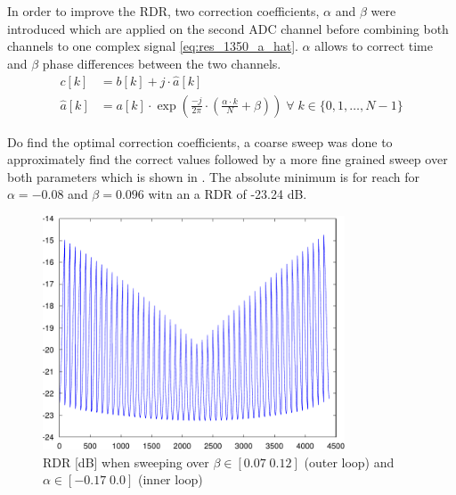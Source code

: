 In order to improve the \gls{RDR}, two correction coefficients, $\alpha$ and
$\beta$ were introduced which are applied on the second \gls{ADC} channel
before combining both channels to one complex signal \eqref{eq:res_1350_a_hat}.
$\alpha$ allows to correct time and $\beta$ phase differences between
the two  channels. \\

\begin{align}
  c[k] &= b[k] + j \cdot \hat a[k] \\
  \hat a[k] &= a[k]  \cdot \exp\left(
  \frac{-j}{2 \pi} \cdot \left(\frac{\alpha \cdot k}{N} + \beta\right)
  \right) \;\forall\; k \in \{0, 1, \dots,  N-1\}
  \label{eq:res_1350_a_hat}
\end{align}

Do find the optimal correction coefficients, a coarse sweep was done to approximately
find the correct values followed by a more fine grained sweep over both parameters
which is shown in .
The absolute minimum is for reach for $\alpha = -0.08$ and $\beta = 0.096$ witn an
a \gls{RDR} of -23.24 dB. \\

\begin{figure}[p]
  \centering
  \includegraphics[width=0.8\textwidth]{figures/matlab/res_1350_ab_sweep}
  \caption{\gls{RDR} [dB] when sweeping over $\beta \in [0.07 \; 0.12]$
    (outer loop) and $\alpha \in [-0.17 \; 0.0]$ (inner loop)}
  \label{fig:res_1350_ab_sweep}
\end{figure}

